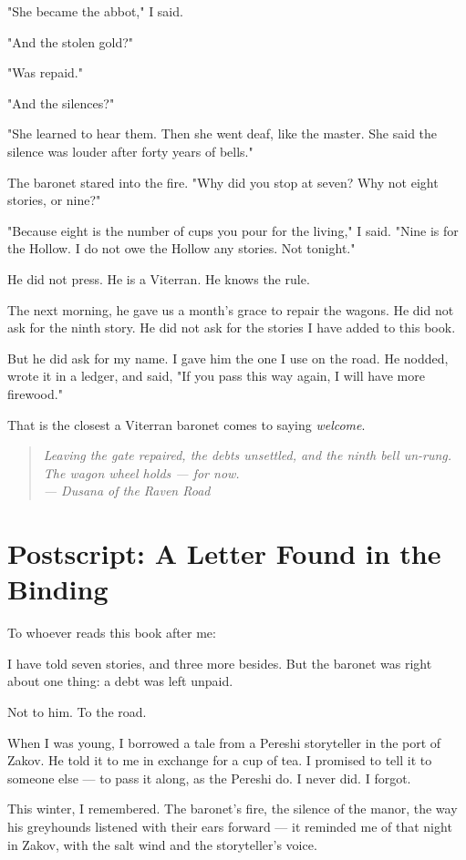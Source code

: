 \documentclass[10pt,twoside]{book}
\newcommand{\dusana}[1]{\begin{quote}\itshape #1 \\ --- Dusana of the Raven Road\end{quote}}
\begin{document}
"She became the abbot," I said.

"And the stolen gold?"

"Was repaid."

"And the silences?"

"She learned to hear them. Then she went deaf, like the master. She said the silence was louder after forty years of bells."

The baronet stared into the fire. "Why did you stop at seven? Why not eight stories, or nine?"

"Because eight is the number of cups you pour for the living," I said. "Nine is for the Hollow. I do not owe the Hollow any stories. Not tonight."

He did not press. He is a Viterran. He knows the rule.

The next morning, he gave us a month's grace to repair the wagons. He did not ask for the ninth story. He did not ask for the stories I have added to this book.

But he did ask for my name. I gave him the one I use on the road. He nodded, wrote it in a ledger, and said, "If you pass this way again, I will have more firewood."

That is the closest a Viterran baronet comes to saying \textit{welcome}.

\dusana{Leaving the gate repaired, the debts unsettled, and the ninth bell un-rung. The wagon wheel holds --- for now.}

\chapter*{Postscript: A Letter Found in the Binding}

To whoever reads this book after me:

I have told seven stories, and three more besides. But the baronet was right about one thing: a debt was left unpaid.

Not to him. To the road.

When I was young, I borrowed a tale from a Pereshi storyteller in the port of Zakov. He told it to me in exchange for a cup of tea. I promised to tell it to someone else --- to pass it along, as the Pereshi do. I never did. I forgot.

This winter, I remembered. The baronet's fire, the silence of the manor, the way his greyhounds listened with their ears forward --- it reminded me of that night in Zakov, with the salt wind and the storyteller's voice.
\end{document}
